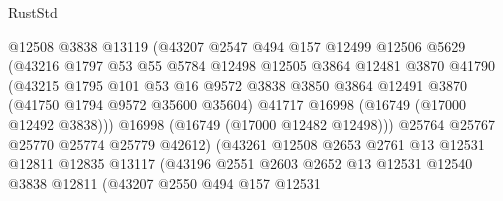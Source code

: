 \begin{lexlean}{RustStd}
\begin{coremodule}
                            @12508
                            @3838
                            @13119
                            (@43207
                              @2547
                              @494
                              @157
                              @12499
                              @12506
                              @5629
                              (@43216
                                @1797
                                @53
                                @55
                                @5784
                                @12498
                                @12505
                                @3864
                                @12481
                                @3870
                                @41790
                                (@43215
                                  @1795
                                  @101
                                  @53
                                  @16
                                  @9572
                                  @3838
                                  @3850
                                  @3864
                                  @12491
                                  @3870
                                  (@41750 @1794 @9572 @35600 @35604)
                                  @41717
                                  @16998
                                  (@16749 (@17000 @12492 @3838)))
                                @16998
                                (@16749 (@17000 @12482 @12498)))
                              @25764
                              @25767
                              @25770
                              @25774
                              @25779
                              @42612)
                            (@43261
                              @12508
                              @2653
                              @2761
                              @13
                              @12531
                              @12811
                              @12835
                              @13117
                              (@43196
                                @2551
                                @2603
                                @2652
                                @13
                                @12531
                                @12540
                                @3838
                                @12811
                                (@43207
                                  @2550
                                  @494
                                  @157
                                  @12531

\end{coremodule}
\end{lexlean}
